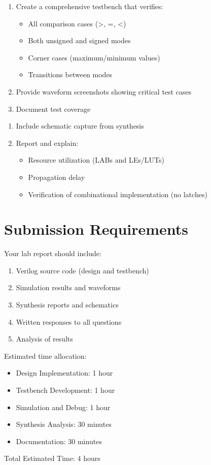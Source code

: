 \documentclass[12pt]{labmanual}
\begin{document}
\begin{question}[Verification]
\begin{enumerate}
    \item Create a comprehensive testbench that verifies:
    \begin{itemize}
        \item All comparison cases (>, =, <)
        \item Both unsigned and signed modes
        \item Corner cases (maximum/minimum values)
        \item Transitions between modes
    \end{itemize}
    \item Provide waveform screenshots showing critical test cases
    \item Document test coverage
\end{enumerate}
\end{question}

\begin{question}
\begin{enumerate}
    \item Include schematic capture from synthesis
    \item Report and explain:
    \begin{itemize}
        \item Resource utilization (LABs and LEs/LUTs)
        \item Propagation delay
        \item Verification of combinational implementation (no latches)
    \end{itemize}
\end{enumerate}
\end{question}

\section{Submission Requirements}
Your lab report should include:
\begin{enumerate}
    \item Verilog source code (design and testbench)
    \item Simulation results and waveforms
    \item Synthesis reports and schematics
    \item Written responses to all questions
    \item Analysis of results
\end{enumerate}

\begin{extra}[frametitle={Time Management}]
Estimated time allocation:
\begin{itemize}
    \item Design Implementation: 1 hour
    \item Testbench Development: 1 hour
    \item Simulation and Debug: 1 hour
    \item Synthesis Analysis: 30 minutes
    \item Documentation: 30 minutes
\end{itemize}
Total Estimated Time: 4 hours
\end{extra}
\end{document}
